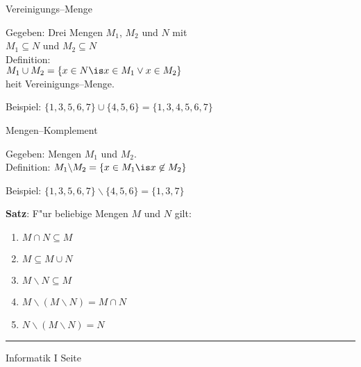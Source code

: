 \begin{slide}{}

\begin{center}
\normalsize
  Vereinigungs--Menge
\end{center}
\footnotesize

Gegeben: Drei Mengen $M_1$, $M_2$ und $N$ mit \\[0.3cm]
\hspace*{1.3cm} $M_1 \subseteq N$ \quad und \quad $M_2 \subseteq N$ \\[0.3cm]
Definition: \\[0.3cm]
\hspace*{1.3cm} $M_1 \cup M_2 = \{ x \in N \is x \in M_1 \vee x \in M_2 \}$  \\[0.3cm]
hei\3t Vereinigungs--Menge.

Beispiel:  $\{1, 3, 5, 6, 7 \} \cup \{4, 5, 6 \} = \{ 1, 3, 4, 5, 6, 7 \}$

\normalsize
\begin{center}
Mengen--Komplement
\end{center}
\vspace{0.5cm}

\footnotesize
Gegeben: Mengen $M_1$ und $M_2$. \\[0.3cm]
Definition: $M_1 \backslash M_2 = \{ x \in M_1 \is x \not\in M_2 \}$

Beispiel:  $\{1, 3, 5, 6, 7 \} \backslash \{4, 5, 6 \} = \{ 1, 3, 7 \}$

\textbf{Satz}: F"ur beliebige Mengen $M$ und $N$ gilt:
\begin{enumerate}
\item $M \cap N \subseteq M$
\item $M \subseteq M \cup N$
\item $M \backslash N \subseteq M$
\item $M \backslash (M \backslash N) = M \cap N$
\item $N \backslash (M \backslash N) = N$
\end{enumerate}

\vspace*{\fill}
\tiny \addtocounter{mypage}{1}
\rule{15cm}{1mm}
Informatik I  \hspace*{\fill} Seite 
\end{slide}


